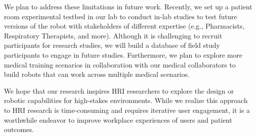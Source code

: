 We plan to address these limitations in future work.
Recently, we set up a patient room experimental testbed in our lab to conduct in-lab studies to test future versions of the robot with stakeholders of different expertise (e.g., Pharmacists, Respiratory Therapists, and more).
Although it is challenging to recruit participants for research studies, we will build a database of field study participants to engage in future studies.
Furthermore, we plan to explore more medical training scenarios in collaboration with our medical collaborators to build robots that can work across multiple medical scenarios.

We hope that our research inspires HRI researchers to explore the design or robotic capabilities for high-stakes environments. 
While we realize this approach to HRI research is time-consuming and requires iterative user engagement, it is a worthwhile endeavor to improve workplace experiences of users and patient outcomes.
